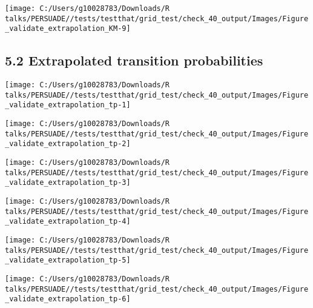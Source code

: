 \documentclass[
]{article}
\begin{document}
\begin{flushleft}\texttt{[image: C:/Users/g10028783/Downloads/R talks/PERSUADE//tests/testthat/grid\_test/check\_40\_output/Images/Figure\_validate\_extrapolation\_KM-9]} \end{flushleft}

\clearpage

\subsection{5.2 Extrapolated transition
probabilities}\label{extrapolated-transition-probabilities}

\begin{flushleft}\texttt{[image: C:/Users/g10028783/Downloads/R talks/PERSUADE//tests/testthat/grid\_test/check\_40\_output/Images/Figure\_validate\_extrapolation\_tp-1]} \end{flushleft}

\begin{flushleft}\texttt{[image: C:/Users/g10028783/Downloads/R talks/PERSUADE//tests/testthat/grid\_test/check\_40\_output/Images/Figure\_validate\_extrapolation\_tp-2]} \end{flushleft}

\begin{flushleft}\texttt{[image: C:/Users/g10028783/Downloads/R talks/PERSUADE//tests/testthat/grid\_test/check\_40\_output/Images/Figure\_validate\_extrapolation\_tp-3]} \end{flushleft}

\begin{flushleft}\texttt{[image: C:/Users/g10028783/Downloads/R talks/PERSUADE//tests/testthat/grid\_test/check\_40\_output/Images/Figure\_validate\_extrapolation\_tp-4]} \end{flushleft}

\begin{flushleft}\texttt{[image: C:/Users/g10028783/Downloads/R talks/PERSUADE//tests/testthat/grid\_test/check\_40\_output/Images/Figure\_validate\_extrapolation\_tp-5]} \end{flushleft}

\begin{flushleft}\texttt{[image: C:/Users/g10028783/Downloads/R talks/PERSUADE//tests/testthat/grid\_test/check\_40\_output/Images/Figure\_validate\_extrapolation\_tp-6]} \end{flushleft}
\end{document}
